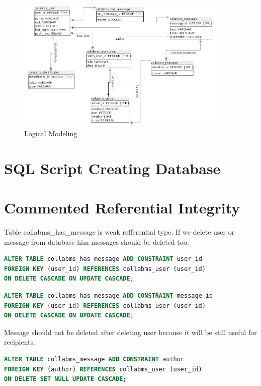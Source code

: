 \documentclass[12pt,oneside,a4paper]{article}
\begin{document}
\begin{figure}[h]
	\centering
	\includegraphics[width=0.9\textwidth]{figures/logical_model.png}
	\caption{Logical Modeling}
	\label{fig.logical_model}
\end{figure}

\section{SQL Script Creating Database}


\newpage

\section{Commented Referential Integrity}

\noindent
Table collabms\_has\_message is weak refferential type. If we delete user or message from database him messages should be deleted too.

\begin{lstlisting}[language=SQL]
ALTER TABLE collabms_has_message ADD CONSTRAINT user_id
FOREIGN KEY (user_id) REFERENCES collabms_user (user_id)
ON DELETE CASCADE ON UPDATE CASCADE;
\end{lstlisting}

\begin{lstlisting}[language=SQL]
ALTER TABLE collabms_has_message ADD CONSTRAINT message_id
FOREIGN KEY (user_id) REFERENCES collabms_user (user_id)
ON DELETE CASCADE ON UPDATE CASCADE;
\end{lstlisting}

\noindent
Message should not be deleted after deleting user because it will be still useful for recipients.

\begin{lstlisting}[language=SQL]
ALTER TABLE collabms_message ADD CONSTRAINT author
FOREIGN KEY (author) REFERENCES collabms_user (user_id)
ON DELETE SET NULL UPDATE CASCADE;
\end{lstlisting}
\end{document}

